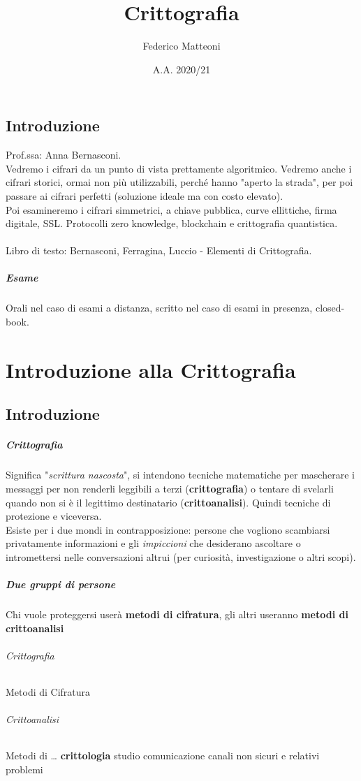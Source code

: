 \documentclass[10pt]{book}
\begin{document}
\renewcommand*\contentsname{Indice}
\title{Crittografia}
\author{Federico Matteoni}
\date{A.A. 2020/21}
\maketitle
\tableofcontents
\pagebreak
\section*{Introduzione}
Prof.ssa: Anna Bernasconi.\\
Vedremo i cifrari da un punto di vista prettamente algoritmico. Vedremo anche i cifrari storici, ormai non più utilizzabili, perché hanno "aperto la strada", per poi passare ai cifrari perfetti (soluzione ideale ma con costo elevato).\\
Poi esamineremo i cifrari simmetrici, a chiave pubblica, curve ellittiche, firma digitale, SSL. Protocolli zero knowledge, blockchain e crittografia quantistica.\\\\
Libro di testo: Bernasconi, Ferragina, Luccio - Elementi di Crittografia.
\paragraph{Esame} Orali nel caso di esami a distanza, scritto nel caso di esami in presenza, closed-book.
\chapter{Introduzione alla Crittografia}
\section{Introduzione}
\paragraph{Crittografia} Significa "\textit{scrittura nascosta}", si intendono tecniche matematiche per mascherare i messaggi per non renderli leggibili a terzi (\textbf{crittografia}) o tentare di svelarli quando non si è il legittimo destinatario (\textbf{crittoanalisi}). Quindi tecniche di protezione e viceversa.\\
Esiste per i due mondi in contrapposizione: persone che vogliono scambiarsi privatamente informazioni e gli \textit{impiccioni} che desiderano ascoltare o intromettersi nelle conversazioni altrui (per curiosità, investigazione o altri scopi).
\paragraph{Due gruppi di persone} Chi vuole proteggersi userà \textbf{metodi di cifratura}, gli altri useranno \textbf{metodi di crittoanalisi}
\subparagraph{Crittografia} Metodi di Cifratura
\subparagraph{Crittoanalisi} Metodi di \ldots
\textbf{crittologia} studio comunicazione canali non sicuri e relativi problemi
\end{document}
